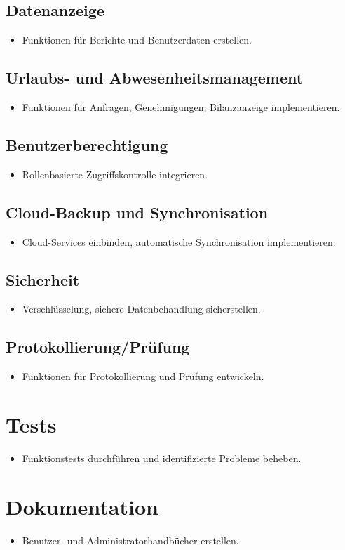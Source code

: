 \documentclass{article}
\begin{document}
\subsection*{Datenanzeige}
\begin{itemize}
  \item Funktionen für Berichte und Benutzerdaten erstellen.
\end{itemize}

\subsection*{Urlaubs- und Abwesenheitsmanagement}
\begin{itemize}
  \item Funktionen für Anfragen, Genehmigungen, Bilanzanzeige implementieren.
\end{itemize}

\subsection*{Benutzerberechtigung}
\begin{itemize}
  \item Rollenbasierte Zugriffskontrolle integrieren.
\end{itemize}

\subsection*{Cloud-Backup und Synchronisation}
\begin{itemize}
  \item Cloud-Services einbinden, automatische Synchronisation implementieren.
\end{itemize}

\subsection*{Sicherheit}
\begin{itemize}
  \item Verschlüsselung, sichere Datenbehandlung sicherstellen.
\end{itemize}

\subsection*{Protokollierung/Prüfung}
\begin{itemize}
  \item Funktionen für Protokollierung und Prüfung entwickeln.
\end{itemize}

\section*{Tests}

\begin{itemize}
  \item Funktionstests durchführen und identifizierte Probleme beheben.
\end{itemize}

\section*{Dokumentation}

\begin{itemize}
  \item Benutzer- und Administratorhandbücher erstellen.
\end{itemize}
\end{document}

